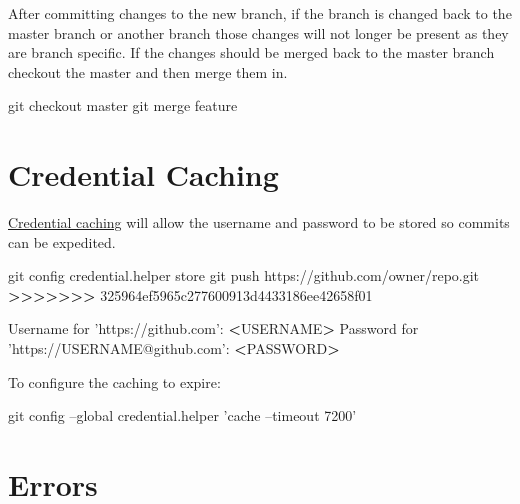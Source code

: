 \documentclass[]{book}
\newenvironment{Shaded}{\begin{snugshade}}{\end{snugshade}}
\newcommand{\ExtensionTok}[1]{#1}
\newcommand{\FunctionTok}[1]{\textcolor[rgb]{0.00,0.00,0.00}{#1}}
\newcommand{\NormalTok}[1]{#1}
\newcommand{\OperatorTok}[1]{\textcolor[rgb]{0.81,0.36,0.00}{\textbf{#1}}}
\newcommand{\StringTok}[1]{\textcolor[rgb]{0.31,0.60,0.02}{#1}}
\begin{document}
After committing changes to the new branch, if the branch is changed back to the master branch or another branch those changes will not longer be present as they are branch specific. If the changes should be merged back to the master branch checkout the master and then merge them in.

\begin{Shaded}
\begin{Highlighting}[]
\FunctionTok{git}\NormalTok{ checkout master}
\FunctionTok{git}\NormalTok{ merge feature}
\end{Highlighting}
\end{Shaded}

\hypertarget{credential-caching}{%
\section{Credential Caching}\label{credential-caching}}

\href{'https://help.github.com/articles/caching-your-github-password-in-git/\#platform-linux'}{Credential caching} will allow the username and password to be stored so commits can be expedited.

\begin{Shaded}
\begin{Highlighting}[]
\FunctionTok{git}\NormalTok{ config credential.helper store}
\FunctionTok{git}\NormalTok{ push https://github.com/owner/repo.git}
\OperatorTok{>>>>>>>} \ExtensionTok{325964ef5965c277600913d4433186ee42658f01}

\ExtensionTok{Username}\NormalTok{ for }\StringTok{'https://github.com'}\NormalTok{: }\OperatorTok{<}\NormalTok{USERNAME}\OperatorTok{>}
\ExtensionTok{Password}\NormalTok{ for }\StringTok{'https://USERNAME@github.com'}\NormalTok{: }\OperatorTok{<}\NormalTok{PASSWORD}\OperatorTok{>}
\end{Highlighting}
\end{Shaded}

To configure the caching to expire:

\begin{Shaded}
\begin{Highlighting}[]
\FunctionTok{git}\NormalTok{ config --global credential.helper }\StringTok{'cache --timeout 7200'}
\end{Highlighting}
\end{Shaded}

\hypertarget{errors}{%
\section{Errors}\label{errors}}
\end{document}
